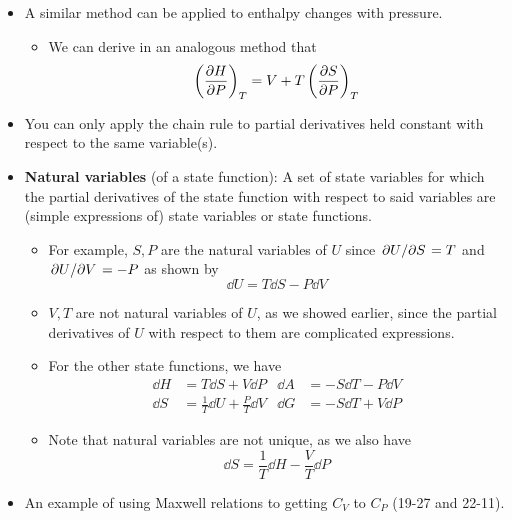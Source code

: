 \documentclass[../notes.tex]{subfiles}
\begin{document}
\begin{itemize}
\begin{itemize}
    \end{itemize}
    \item A similar method can be applied to enthalpy changes with pressure.
    \begin{itemize}
        \item We can derive in an analogous method that
        \begin{equation*}
            \left( \pdv{H}{P} \right)_T = V+T\left( \pdv{S}{P} \right)_T
        \end{equation*}
    \end{itemize}
    \item You can only apply the chain rule to partial derivatives held constant with respect to the same variable(s).
    \item \textbf{Natural variables} (of a state function): A set of state variables for which the partial derivatives of the state function with respect to said variables are (simple expressions of) state variables or state functions.
    \begin{itemize}
        \item For example, $S,P$ are the natural variables of $U$ since $\pdv*{U}{S}=T$ and $\pdv*{U}{V}=-P$ as shown by
        \begin{equation*}
            \dd{U} = T\dd{S}-P\dd{V}
        \end{equation*}
        \item $V,T$ are not natural variables of $U$, as we showed earlier, since the partial derivatives of $U$ with respect to them are complicated expressions.
        \item For the other state functions, we have
        \begin{align*}
            \dd{H} &= T\dd{S}+V\dd{P}&
                \dd{A} &= -S\dd{T}-P\dd{V}\\
            \dd{S} &= \frac{1}{T}\dd{U}+\frac{P}{T}\dd{V}&
                \dd{G} &= -S\dd{T}+V\dd{P}
        \end{align*}
        \item Note that natural variables are not unique, as we also have
        \begin{equation*}
            \dd{S} = \frac{1}{T}\dd{H}-\frac{V}{T}\dd{P}
        \end{equation*}
    \end{itemize}
    \item An example of using Maxwell relations to getting $C_V$ to $C_P$ (19-27 and 22-11).
    \begin{itemize}

\end{itemize}
\end{itemize}
\end{document}

